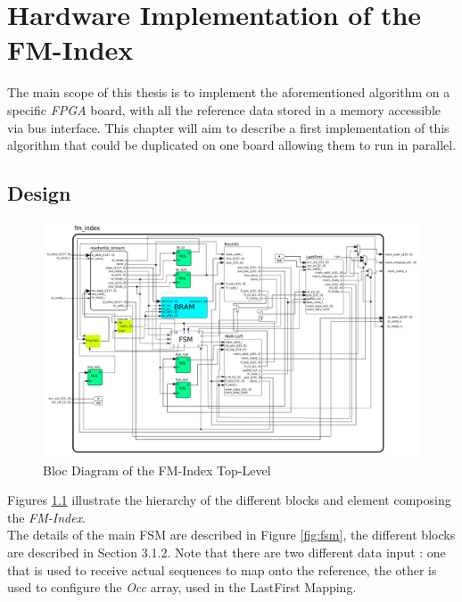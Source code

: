 
\chapter{Hardware Implementation of the FM-Index} %

\label{Chapter3} %
The main scope of this thesis is to implement the aforementioned algorithm on a specific \textsl{FPGA} board, with all the reference data stored in a memory accessible via bus interface. This chapter will aim to describe a first implementation of this algorithm that could be duplicated on one board allowing them to run in parallel.

\section{Design}

\begin{figure}[H]
    \centering
    \hspace*{-20mm}\includegraphics[scale = 0.45]{Figures/fmindex_top.png}
    \caption{Bloc Diagram of the FM-Index Top-Level}
    \label{fig:seqschema}
\end{figure}

Figures \ref{fig:seqschema} illustrate the hierarchy of the different blocks and element composing the \textsl{FM-Index}. \\

The details of the main FSM are described in Figure \ref{fig:fsm}, the different blocks are described in Section 3.1.2. Note that there are two different data input : one that is used to receive actual sequences to map onto the reference, the other is used to configure the \textsl{Occ} array, used in the LastFirst Mapping.

